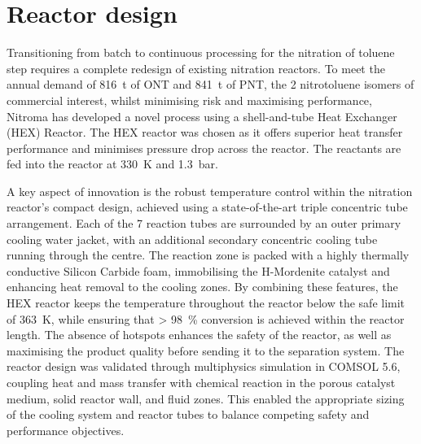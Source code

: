 \section*{Reactor design}
Transitioning from batch to continuous processing for the nitration of toluene step requires a complete redesign of existing nitration reactors. To meet the annual demand of \SI{816}{\tonne} of ONT and \SI{841}{\tonne} of PNT, the 2 nitrotoluene isomers of commercial interest, whilst minimising risk and maximising performance, Nitroma has developed a novel process using a shell-and-tube Heat Exchanger (HEX) Reactor. The HEX reactor was chosen as it offers superior heat transfer performance and minimises pressure drop across the reactor. The reactants are fed into the reactor at \SI{330}{\K} and \SI{1.3}{bar}.

A key aspect of innovation is the robust temperature control within the nitration reactor's compact design, achieved using a state-of-the-art triple concentric tube arrangement. Each of the 7 reaction tubes are surrounded by an outer primary cooling water jacket, with an additional secondary concentric cooling tube running through the centre. The reaction zone is packed with a highly thermally conductive Silicon Carbide foam, immobilising the H-Mordenite catalyst and enhancing heat removal to the cooling zones. By combining these features, the HEX reactor keeps the temperature throughout the reactor below the safe limit of \SI{363}{\K}, while ensuring that \SI{> 98}{\percent} conversion is achieved within the reactor length. The absence of hotspots enhances the safety of the reactor, as well as maximising the product quality before sending it to the separation system. The reactor design was validated through multiphysics simulation in COMSOL 5.6, coupling heat and mass transfer with chemical reaction in the porous catalyst medium, solid reactor wall, and fluid zones. This enabled the appropriate sizing of the cooling system and reactor tubes to balance competing safety and performance objectives.

